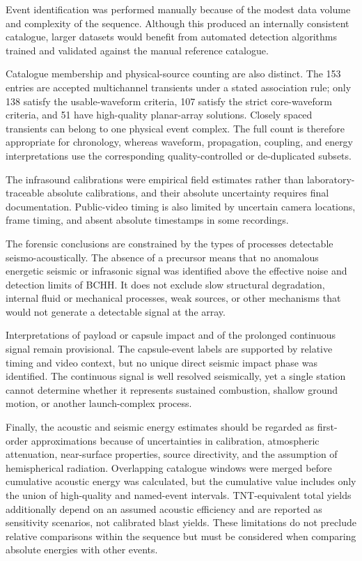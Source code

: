 \documentclass[]{seismica}
\begin{document}
Event identification was performed manually because of the modest data volume and complexity of the sequence. Although this produced an internally consistent catalogue, larger datasets would benefit from automated detection algorithms trained and validated against the manual reference catalogue.

Catalogue membership and physical-source counting are also distinct. The 153
entries are accepted multichannel transients under a stated association rule;
only 138 satisfy the usable-waveform criteria, 107 satisfy the strict
core-waveform criteria, and 51 have high-quality planar-array solutions.
Closely spaced transients can belong to one physical event complex. The full
count is therefore appropriate for chronology, whereas waveform, propagation,
coupling, and energy interpretations use the corresponding quality-controlled
or de-duplicated subsets.

The infrasound calibrations were empirical field estimates rather than
laboratory-traceable absolute calibrations, and their absolute uncertainty
requires final documentation. Public-video timing is also limited by uncertain
camera locations, frame timing, and absent absolute timestamps in some
recordings.

The forensic conclusions are constrained by the types of processes detectable
seismo-acoustically. The absence of a precursor means that no anomalous
energetic seismic or infrasonic signal was identified above the effective noise
and detection limits of BCHH. It does not exclude slow structural degradation,
internal fluid or mechanical processes, weak sources, or other mechanisms that
would not generate a detectable signal at the array.

Interpretations of payload or capsule impact and of the prolonged continuous
signal remain provisional. The capsule-event labels are supported by relative
timing and video context, but no unique direct seismic impact phase was
identified. The continuous signal is well resolved seismically, yet a single
station cannot determine whether it represents sustained combustion, shallow
ground motion, or another launch-complex process.

Finally, the acoustic and seismic energy estimates should be regarded as
first-order approximations because of uncertainties in calibration,
atmospheric attenuation, near-surface properties, source directivity, and the
assumption of hemispherical radiation. Overlapping catalogue windows were
merged before cumulative acoustic energy was calculated, but the cumulative
value includes only the union of high-quality and named-event intervals.
TNT-equivalent total yields additionally depend on an assumed acoustic
efficiency and are reported as sensitivity scenarios, not calibrated blast
yields. These limitations do not preclude relative comparisons within the
sequence but must be considered when comparing absolute energies with other
events.
\end{document}
